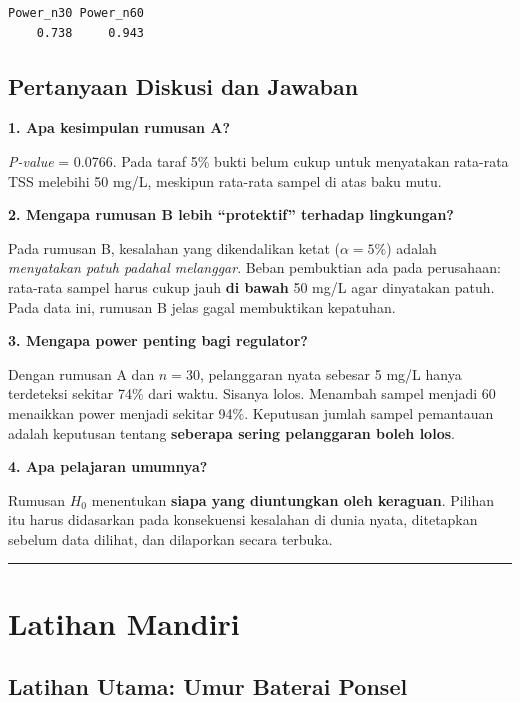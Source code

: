 \documentclass[
  indonesian,
  letterpaper,
]{book}
\begin{document}
\begin{verbatim}
Power_n30 Power_n60 
    0.738     0.943 
\end{verbatim}

\section{Pertanyaan Diskusi dan
Jawaban}\label{pertanyaan-diskusi-dan-jawaban-1}

\textbf{1. Apa kesimpulan rumusan A?}

\emph{P-value} = 0.0766. Pada taraf 5\% bukti belum cukup untuk
menyatakan rata-rata TSS melebihi 50 mg/L, meskipun rata-rata sampel di
atas baku mutu.

\textbf{2. Mengapa rumusan B lebih ``protektif'' terhadap lingkungan?}

Pada rumusan B, kesalahan yang dikendalikan ketat (\(\alpha = 5\%\))
adalah \emph{menyatakan patuh padahal melanggar}. Beban pembuktian ada
pada perusahaan: rata-rata sampel harus cukup jauh \textbf{di bawah} 50
mg/L agar dinyatakan patuh. Pada data ini, rumusan B jelas gagal
membuktikan kepatuhan.

\textbf{3. Mengapa power penting bagi regulator?}

Dengan rumusan A dan \(n = 30\), pelanggaran nyata sebesar 5 mg/L hanya
terdeteksi sekitar 74\% dari waktu. Sisanya lolos. Menambah sampel
menjadi 60 menaikkan power menjadi sekitar 94\%. Keputusan jumlah sampel
pemantauan adalah keputusan tentang \textbf{seberapa sering pelanggaran
boleh lolos}.

\textbf{4. Apa pelajaran umumnya?}

Rumusan \(H_0\) menentukan \textbf{siapa yang diuntungkan oleh
keraguan}. Pilihan itu harus didasarkan pada konsekuensi kesalahan di
dunia nyata, ditetapkan sebelum data dilihat, dan dilaporkan secara
terbuka.

\begin{center}\rule{0.5\linewidth}{0.5pt}\end{center}


\chapter{Latihan Mandiri}\label{latihan-mandiri-1}

\section{Latihan Utama: Umur Baterai
Ponsel}\label{latihan-utama-umur-baterai-ponsel}
\end{document}

